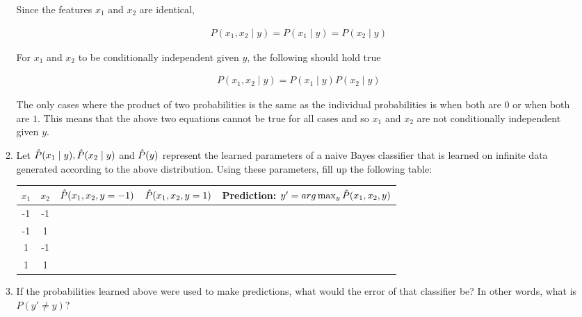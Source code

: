 \begin{enumerate}
\begin{enumerate}
Since the features $x_1$ and $x_2$ are identical,
    
\begin{equation*}
\begin{aligned}
P(x_1,x_2 \mid y) = P(x_1 \mid y) = P(x_2 \mid y)
\end{aligned}
\end{equation*} 

For $x_1$ and $x_2$ to be conditionally independent given $y$, the following should hold true

\begin{equation*}
\begin{aligned}
P(x_1,x_2 \mid y) = P(x_1 \mid y) P(x_2 \mid y)
\end{aligned}
\end{equation*} 

The only cases where the product of two probabilities is the same as the individual probabilities is when both are $0$ or when both are $1$. This means that the above two equations cannot be true for all cases and so $x_1$ and $x_2$ are not conditionally independent given $y$.
    
  \item \relax[8 points] Let $\hat{P}(x_1 \mid y), \hat{P}(x_2 \mid y)$ and
    $\hat{P}(y)$ represent the learned parameters of a naive Bayes
    classifier that is learned on infinite data generated according to
    the above distribution. Using these parameters, fill up the
    following table:


    \begin{tabular}{|c|c|c|c|c|}
      \hline
      $x_1$ & $x_2$ & $\hat{P}(x_1, x_2, y= -1)$ & $\hat{P}(x_1, x_2, y=1)$ & {\bf Prediction: $y' = arg\max_y \hat{P}(x_1, x_2, y)$} \\
      \hline
      -1    & -1    &                        &                      &                                                   \\
      -1    & 1     &                        &                      &                                                   \\
      1     & -1    &                        &                      &                                                   \\
      1     & 1     &                        &                      &                                                   \\
      \hline
    \end{tabular}

  \item \relax[3 points] If the probabilities learned above were used to
    make predictions, what would the error of that classifier be? In
    other words, what is $P(y' \ne y)$?


\end{enumerate}
\end{enumerate}
